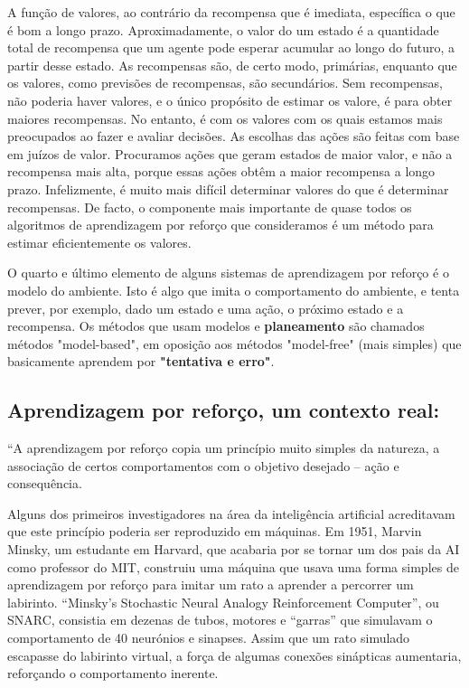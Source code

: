 A função de valores, ao contrário da recompensa que é imediata, específica o que é bom a longo prazo. Aproximadamente, o valor do um estado é a quantidade total de recompensa que um agente pode esperar acumular ao longo do futuro, a partir desse estado. As recompensas são, de certo modo, primárias, enquanto que os valores, como previsões de recompensas, são secundários. Sem recompensas, não poderia haver valores, e o único propósito de estimar os valore,  é para obter maiores recompensas. No entanto, é com os  valores com os quais estamos mais  preocupados ao fazer e avaliar decisões. As escolhas das ações são feitas com base em juízos de valor. Procuramos ações que geram estados de maior valor, e não a recompensa mais alta, porque essas ações obtêm a maior  recompensa a longo prazo. Infelizmente, é muito mais difícil determinar valores do que é determinar recompensas. De facto, o componente mais importante de quase todos os algoritmos de aprendizagem por reforço que consideramos é um método para estimar eficientemente os valores.

O quarto e último elemento de alguns sistemas de aprendizagem por reforço é o modelo do ambiente. Isto é algo que imita o comportamento do ambiente, e tenta prever, por exemplo, dado um estado  e uma ação, o próximo estado e a recompensa. Os métodos que usam modelos e \textbf{planeamento} são chamados métodos "model-based", em oposição aos métodos "model-free" (mais simples) que basicamente aprendem por \textbf{"tentativa e erro"}.





\subsection{Aprendizagem por reforço, um contexto real:}
 
“A aprendizagem por reforço copia um princípio muito simples da natureza, a associação de certos comportamentos com o objetivo desejado – ação e consequência.

Alguns dos primeiros investigadores na área da inteligência artificial acreditavam que este princípio poderia ser reproduzido em máquinas. Em 1951, Marvin Minsky, um estudante em Harvard, que acabaria por se tornar um dos pais da AI como professor do MIT, construiu uma máquina que usava uma forma simples de aprendizagem por reforço para imitar um rato a aprender a percorrer um labirinto. “Minsky’s Stochastic Neural Analogy Reinforcement Computer”, ou SNARC, consistia em dezenas de tubos, motores e “garras” que simulavam o comportamento de 40 neurónios e sinapses. Assim que um rato simulado escapasse do labirinto virtual, a força de algumas conexões sinápticas aumentaria, reforçando o comportamento inerente.


